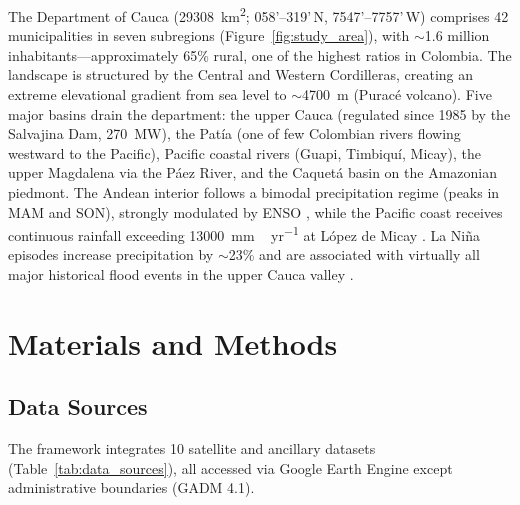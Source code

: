 \documentclass{article}
\begin{document}
The Department of Cauca (\SI{29308}{\kilo\metre\squared}; 0\textdegree{}58'--3\textdegree{}19'\,N, 75\textdegree{}47'--77\textdegree{}57'\,W) comprises 42 municipalities in seven subregions (Figure~\ref{fig:study_area}), with $\sim$1.6 million inhabitants---approximately 65\% rural, one of the highest ratios in Colombia. The landscape is structured by the Central and Western Cordilleras, creating an extreme elevational gradient from sea level to $\sim$\SI{4700}{\metre} (Purac\'e volcano). Five major basins drain the department: the upper Cauca (regulated since 1985 by the Salvajina Dam, 270~MW), the Pat\'ia (one of few Colombian rivers flowing westward to the Pacific), Pacific coastal rivers (Guapi, Timbiqu\'i, Micay), the upper Magdalena via the P\'aez River, and the Caquet\'a basin on the Amazonian piedmont. The Andean interior follows a bimodal precipitation regime (peaks in MAM and SON), strongly modulated by ENSO \citep{Poveda2001, Puertas2019}, while the Pacific coast receives continuous rainfall exceeding \SI{13000}{mm\,yr^{-1}} at L\'opez de Micay \citep{Poveda2004}. La Ni\~na episodes increase precipitation by $\sim$23\% and are associated with virtually all major historical flood events in the upper Cauca valley \citep{Enciso2016, Loaiza2021}.

\section{Materials and Methods}
\label{sec:methods}

\subsection{Data Sources}

The framework integrates 10 satellite and ancillary datasets (Table~\ref{tab:data_sources}), all accessed via Google Earth Engine \citep{Gorelick2017} except administrative boundaries (GADM 4.1).
\end{document}
